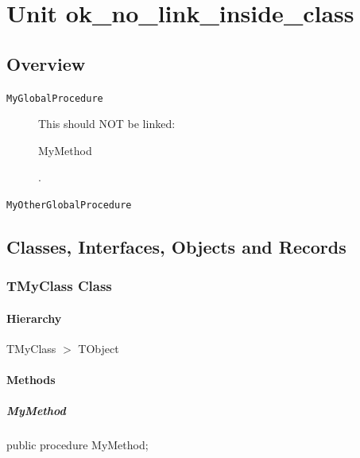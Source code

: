 \documentclass{report}
\begin{document}
\newlength{\tmplength}
\chapter{Unit ok{\_}no{\_}link{\_}inside{\_}class}
\section{Overview}
\begin{description}
\item[\texttt{\begin{ttfamily}TMyClass\end{ttfamily} Class}]
\end{description}
\begin{description}
\item[\texttt{MyGlobalProcedure}]This should NOT be linked: \begin{ttfamily}MyMethod\end{ttfamily}.
\item[\texttt{MyOtherGlobalProcedure}]
\end{description}
\section{Classes, Interfaces, Objects and Records}
\subsection*{TMyClass Class}
\subsubsection*{\large{\textbf{Hierarchy}}\normalsize\hspace{1ex}\hfill}
TMyClass {$>$} TObject
\subsubsection*{\large{\textbf{Methods}}\normalsize\hspace{1ex}\hfill}
\paragraph*{MyMethod}\hspace*{\fill}

\begin{list}{}{
\setlength{\itemindent}{0cm}
\setlength{\listparindent}{0cm}
\setlength{\leftmargin}{\evensidemargin}
\addtolength{\leftmargin}{\tmplength}
\settowidth{\labelsep}{X}
\addtolength{\leftmargin}{\labelsep}
\setlength{\labelwidth}{\tmplength}
}
\begin{flushleft}
\item[\textbf{Declaration}\hfill]
\begin{ttfamily}
public procedure MyMethod;\end{ttfamily}


\end{flushleft}
\end{list}
\end{document}
